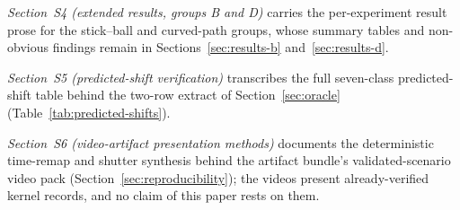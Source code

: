 \documentclass[review,12pt,authoryear]{elsarticle}
\begin{document}
\emph{Section~S4 (extended results, groups B and D)} carries the
per-experiment result prose for the stick--ball and curved-path groups,
whose summary tables and non-obvious findings remain in
Sections~\ref{sec:results-b} and~\ref{sec:results-d}.

\emph{Section~S5 (predicted-shift verification)} transcribes the full
seven-class predicted-shift table behind the two-row extract of
Section~\ref{sec:oracle} (Table~\ref{tab:predicted-shifts}).

\emph{Section~S6 (video-artifact presentation methods)} documents the
deterministic time-remap and shutter synthesis behind the artifact
bundle's validated-scenario video pack
(Section~\ref{sec:reproducibility}); the videos present
already-verified kernel records, and no claim of this paper rests on
them.



\end{document}
